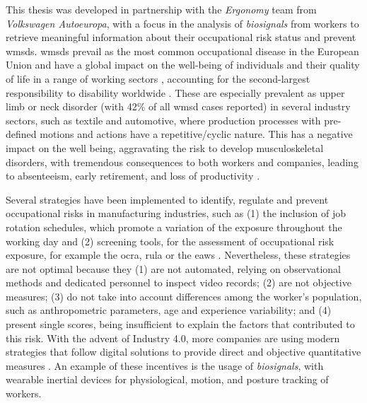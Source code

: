 This thesis was developed in partnership with the \textit{Ergonomy} team from \textit{Volkswagen Autoeuropa}, with a focus in the analysis of \textit{biosignals} from workers to retrieve meaningful information about their occupational risk status and prevent \gls{wmsd}s. \gls{wmsd}s prevail as the most common occupational disease in the European Union and have a global impact on the well-being of individuals and their quality of life in a range of working sectors \cite{Irastorza2010}, accounting for the second-largest responsibility to disability worldwide \cite{Luttmann2003}. These are especially prevalent as upper limb or neck disorder (with 42\% of all \gls{wmsd} cases reported) \cite{Seidel2019} in several industry sectors, such as textile and automotive, where production processes with pre-defined motions and actions have a repetitive/cyclic nature. This has a negative impact on the well being, aggravating the risk to develop musculoskeletal disorders, with tremendous consequences to both workers and companies, leading to absenteeism, early retirement, and loss of productivity \cite{Trabalhadores, Varandas19}. 

Several strategies have been implemented to identify, regulate and prevent occupational risks in manufacturing industries, such as (1) the inclusion of job rotation schedules, which promote a variation of the exposure throughout the working day \cite{jobrotation1, jobrotation2} and (2) screening tools, for the assessment of occupational risk exposure, for example the \gls{ocra}, \gls{rula} or the \gls{eaws} \cite{ocra, rula, eaws}. Nevertheless, these strategies are not optimal because they (1) are not automated, relying on observational methods and dedicated personnel to inspect video records; (2) are not objective measures; (3) do not take into account differences among the worker's population, such as anthropometric parameters, age and experience variability; and (4) present single scores, being insufficient to explain the factors that contributed to this risk. With the advent of Industry 4.0, more companies are using modern strategies that follow digital solutions to provide direct and objective quantitative measures \cite{romero}. An example of these incentives is the usage of \textit{biosignals}, with wearable inertial devices for physiological, motion, and posture tracking of workers.

